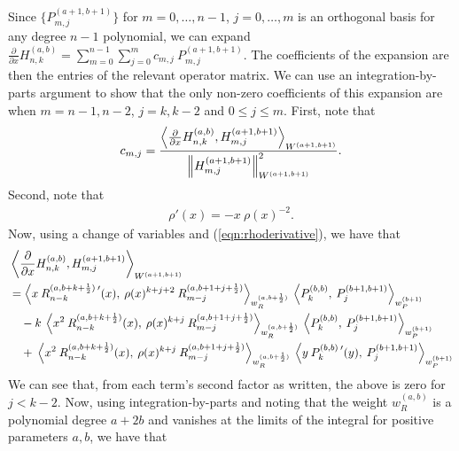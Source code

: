 \documentclass[11pt, oneside]{article}   	%
\newcommand{\half}{\frac{1}{2}}
\newcommand{\pddx}{\frac{\partial}{\partial x}}
\newcommand{\hdop}{H}
\newcommand{\hdopnkab}{\hdop_{n,k}^{(a,b)}}
\newcommand{\genjac}{R}
\newcommand{\genjacnmk}{\genjac_{n-k}}
\newcommand{\genjacmmj}{\genjac_{m-j}}
\newcommand{\genjacw}{w_\genjac}
\begin{document}
Since $\{P^{(a+1, b+1)}_{m,j}\}$ for $m = 0,\dots,n-1$, $j = 0,\dots,m$ is an orthogonal basis for any degree $n-1$ polynomial, we can expand $\pddx \hdopnkab = \sum_{m=0}^{n-1} \sum_{j=0}^m c_{m,j} \: P^{(a+1, b+1)}_{m,j}$. The coefficients of the expansion are then the entries of the relevant operator matrix. We can use an integration-by-parts argument to show that the only non-zero coefficients of this expansion are when $m = n-1, n-2$, $j = k, k-2$ and $0 \le j \le m$. First, note that
\begin{align*}
c_{m,j} = \frac{\ip<\pddx \hdopnkab, \hdop^{(a+1, b+1)}_{m,j} >_{W^{(a+1, b+1)}}}{\norm{\hdop^{(a+1, b+1)}_{m,j}}^2_{W^{(a+1, b+1)}}}.
\end{align*}
Second, note that
\begin{align}
	\rho'(x) = -x \: \rho(x)^{-2}. \label{eqn:rhoderivative}
\end{align}
Now, using a change of variables and (\ref{eqn:rhoderivative}), we have that
\begin{align*}
	&\ip<\pddx \hdopnkab, \hdop^{(a+1, b+1)}_{m,j} >_{W^{(a+1, b+1)}} \nonumber \\ 
	&= \ip< x \: \genjacnmk^{(a, b+k+\half) \: \prime} (x), \: \rho(x)^{k+j+2} \: \genjacmmj^{(a, b+1+j+\half)} >_{\genjacw^{(a, b+\half)}} 
		\: \ip< P_k^{(b,b)}, \: P_j^{(b+1,b+1)} >_{w_P^{(b+1)}}  \nonumber \\ 
	& \quad - k \: \ip< x^2 \: \genjacnmk^{(a, b+k+\half)}(x), \: \rho(x)^{k+j} \: \genjacmmj^{(a, b+1+j+\half)} >_{\genjacw^{(a, b+\half)}} 
		\: \ip< P_k^{(b,b)}, \: P_j^{(b+1,b+1)} >_{w_P^{(b+1)}}  \nonumber \\ 
	& \quad + \: \ip< x^2 \: \genjacnmk^{(a, b+k+\half)}(x), \: \rho(x)^{k+j} \: \genjacmmj^{(a, b+1+j+\half)} >_{\genjacw^{(a, b+\half)}} 
		\: \ip< y \: P_k^{(b,b) \: \prime} (y), \: P_j^{(b+1,b+1)} >_{w_P^{(b+1)}}  
\end{align*}
We can see that, from each term's second factor as written, the above is zero for $j < k-2$. Now, using integration-by-parts and noting that the weight $\genjacw^{(a,b)}$ is a polynomial degree $a+2b$ and vanishes at the limits of the integral for positive parameters $a,b$, we have that
\end{document}
